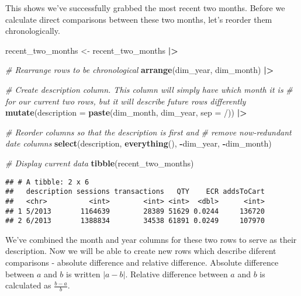 \documentclass[
]{article}
\newenvironment{Shaded}{\begin{snugshade}}{\end{snugshade}}
\newcommand{\AttributeTok}[1]{\textcolor[rgb]{0.13,0.29,0.53}{#1}}
\newcommand{\CommentTok}[1]{\textcolor[rgb]{0.56,0.35,0.01}{\textit{#1}}}
\newcommand{\FunctionTok}[1]{\textcolor[rgb]{0.13,0.29,0.53}{\textbf{#1}}}
\newcommand{\NormalTok}[1]{#1}
\newcommand{\OtherTok}[1]{\textcolor[rgb]{0.56,0.35,0.01}{#1}}
\newcommand{\SpecialCharTok}[1]{\textcolor[rgb]{0.81,0.36,0.00}{\textbf{#1}}}
\newcommand{\StringTok}[1]{\textcolor[rgb]{0.31,0.60,0.02}{#1}}
\begin{document}
This shows we've successfully grabbed the most recent two months. Before
we calculate direct comparisons between these two months, let's reorder
them chronologically.

\begin{Shaded}
\begin{Highlighting}[]
\NormalTok{recent\_two\_months }\OtherTok{\textless{}{-}}\NormalTok{ recent\_two\_months }\SpecialCharTok{|\textgreater{}}
  
  \CommentTok{\# Rearrange rows to be chronological}
  \FunctionTok{arrange}\NormalTok{(dim\_year, dim\_month) }\SpecialCharTok{|\textgreater{}}

  \CommentTok{\# Create description column. This column will simply have which month it is}
  \CommentTok{\# for our current two rows, but it will describe future rows differently}
  \FunctionTok{mutate}\NormalTok{(}\AttributeTok{description =} \FunctionTok{paste}\NormalTok{(dim\_month, dim\_year, }\AttributeTok{sep =} \StringTok{\textquotesingle{}/\textquotesingle{}}\NormalTok{)) }\SpecialCharTok{|\textgreater{}}

  \CommentTok{\# Reorder columns so that the description is first and}
  \CommentTok{\# remove now{-}redundant date columns}
  \FunctionTok{select}\NormalTok{(description, }\FunctionTok{everything}\NormalTok{(), }\SpecialCharTok{{-}}\NormalTok{dim\_year, }\SpecialCharTok{{-}}\NormalTok{dim\_month)}

\CommentTok{\# Display current data}
\FunctionTok{tibble}\NormalTok{(recent\_two\_months)}
\end{Highlighting}
\end{Shaded}

\begin{verbatim}
## # A tibble: 2 x 6
##   description sessions transactions   QTY    ECR addsToCart
##   <chr>          <int>        <int> <int>  <dbl>      <int>
## 1 5/2013       1164639        28389 51629 0.0244     136720
## 2 6/2013       1388834        34538 61891 0.0249     107970
\end{verbatim}

We've combined the month and year columns for these two rows to serve as
their description. Now we will be able to create new rows which describe
diferent comparisons - absolute difference and relative difference.
Absolute difference between \(a\) and \(b\) is written \(|a - b|\).
Relative difference between \(a\) and \(b\) is calculated as
\(\frac{b-a}{b}\).
\end{document}
